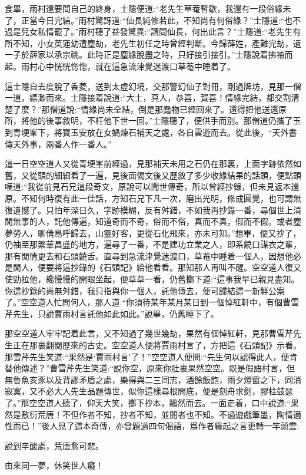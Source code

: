 \begin{parag}
    食畢，雨村還要問自己的終身，士隱便道:“老先生草菴暫歇，我還有一段俗緣未了，正當今日完結。”雨村驚訝道:“仙長純修若此，不知尚有何俗緣？”士隱道:“也不過是兒女私情罷了。”雨村聽了益發驚異:“請問仙長，何出此言？”士隱道:“老先生有所不知，小女英蓮幼遭塵劫，老先生初任之時曾經判斷。今歸薛姓，產難完劫，遺一子於薛家以承宗祧。此時正是塵緣脫盡之時，只好接引接引。”士隱說着拂袖而起。雨村心中恍恍惚惚，就在這急流津覺迷渡口草菴中睡着了。
\end{parag}


\begin{parag}
    這士隱自去度脫了香菱，送到太虛幻境，交那警幻仙子對冊，剛過牌坊，見那一僧一道，縹渺而來。士隱接着說道:“大士，真人，恭喜，賀喜！情緣完結，都交割清楚了麼？”那僧道說:“情緣尚未全結，倒是那蠢物已經回來了。還得把他送還原所，將他的後事敘明，不枉他下世一回。”士隱聽了，便供手而別。那僧道仍攜了玉到青埂峯下，將寶玉安放在女媧煉石補天之處，各自雲遊而去。從此後，“天外書傳天外事，兩番人作一番人。”
\end{parag}


\begin{parag}
    這一日空空道人又從青埂峯前經過，見那補天未用之石仍在那裏，上面字跡依然如舊，又從頭的細細看了一遍，見後面偈文後又歷敘了多少收緣結果的話頭，便點頭嘆道:“我從前見石兄這段奇文，原說可以聞世傳奇，所以曾經抄錄，但未見返本還原。不知何時復有此一佳話，方知石兄下凡一次，磨出光明，修成圓覺，也可謂無復遺憾了。只怕年深日久，字跡模糊，反有舛錯，不如我再抄錄一番，尋個世上清閒無事的人，託他傳遍，知道奇而不奇，俗而不俗，真而不真，假而不假。或者塵夢勞人，聊倩鳥呼歸去，山靈好客，更從石化飛來，亦未可知。”想畢，便又抄了，仍袖至那繁華昌盛的地方，遍尋了一番，不是建功立業之人，即系饒口謀衣之輩，那有閒情更去和石頭饒舌。直尋到急流津覺迷渡口，草菴中睡着一個人，因想他必是閒人，便要將這抄錄的《石頭記》給他看看。那知那人再叫不醒。空空道人復又使勁拉他，纔慢慢的開眼坐起，便草草一看，仍舊擲下道:“這事我早已親見盡知。你這抄錄的尚無舛錯，我只指與你一個人，託他傳去，便可歸結這一新鮮公案了。”空空道人忙問何人，那人道:“你須待某年某月某日到一個悼紅軒中，有個曹雪芹先生，只說賈雨村言託他如此如此。”說畢，仍舊睡下了。
\end{parag}


\begin{parag}
    那空空道人牢牢記着此言，又不知過了幾世幾劫，果然有個悼紅軒，見那曹雪芹先生正在那裏翻閱歷來的古史。空空道人便將賈雨村言了，方把這《石頭記》示看。那雪芹先生笑道:“果然是‘賈雨村言’了！”空空道人便問:“先生何以認得此人，便肯替他傳述？”曹雪芹先生笑道:“說你空，原來你肚裏果然空空。既是假語村言，但無魯魚亥豕以及背謬矛盾之處，樂得與二三同志，酒餘飯飽，雨夕燈窗之下，同消寂寞，又不必大人先生品題傳世，似你這樣尋根問底，便是刻舟求劍，膠柱鼓瑟了。”那空空道人聽了，仰天大笑，擲下抄本，飄然而去。一面走着，口中說道:“果然是敷衍荒唐！不但作者不知，抄者不知，並閱者也不知。不過遊戲筆墨，陶情適性而已！”後人見了這本奇傳，亦曾題過四句偈語，爲作者緣起之言更轉一竿頭雲:
\end{parag}


\begin{poem}
    \begin{pl}
        說到辛酸處，荒唐愈可悲。
    \end{pl}

    \begin{pl}
        由來同一夢，休笑世人癡！
    \end{pl}
\end{poem}